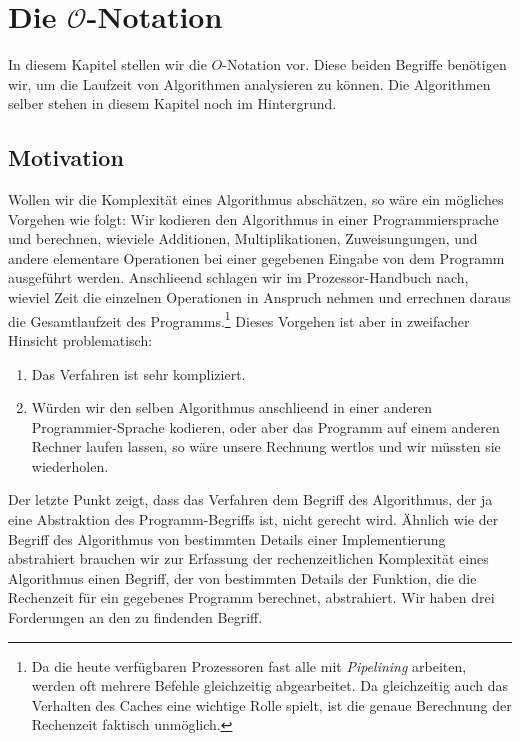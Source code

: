 \chapter{Die $\mathcal{O}$-Notation} 
In diesem Kapitel  stellen wir
die $O$-Notation vor.  Diese beiden Begriffe ben\"otigen wir, um die Laufzeit von
Algorithmen analysieren zu k\"onnen.  Die Algorithmen selber stehen in diesem Kapitel noch
im Hintergrund.

\section{Motivation}
Wollen wir die Komplexit\"at eines Algorithmus absch\"atzen, so w\"are ein m\"ogliches Vorgehen
wie folgt: Wir kodieren den Algorithmus in einer Programmiersprache und berechnen,
wieviele Additionen, Multiplikationen, Zuweisungungen, und andere elementare Operationen
bei einer gegebenen Eingabe von dem Programm ausgef\"uhrt werden. Anschlie\3end schlagen wir
im Prozessor-Handbuch nach, wieviel Zeit die einzelnen Operationen in Anspruch nehmen und
errechnen daraus die Gesamtlaufzeit des Programms.\footnote{
Da die heute verf\"ugbaren Prozessoren fast alle mit \emph{Pipelining} arbeiten, werden oft
mehrere Befehle gleichzeitig abgearbeitet. Da gleichzeitig auch das Verhalten des Caches
eine wichtige Rolle spielt, ist die genaue Berechnung der Rechenzeit faktisch unm\"oglich.}
Dieses Vorgehen ist aber in zweifacher Hinsicht problematisch:
\begin{enumerate}
\item Das Verfahren ist sehr kompliziert.
\item W\"urden wir den selben Algorithmus anschlie\3end in einer anderen Programmier-Sprache
      kodieren, oder aber das Programm auf einem anderen Rechner laufen lassen, so w\"are
      unsere Rechnung wertlos und wir m\"ussten sie wiederholen.
\end{enumerate}
Der letzte Punkt zeigt, dass das Verfahren dem Begriff des Algorithmus, der ja eine
Abstraktion des Programm-Begriffs ist, nicht gerecht wird.  Ähnlich wie der Begriff des
Algorithmus von bestimmten Details einer Implementierung abstrahiert brauchen wir zur
Erfassung der rechenzeitlichen Komplexit\"at eines Algorithmus einen Begriff, der von
bestimmten Details der Funktion, die die Rechenzeit f\"ur ein gegebenes Programm berechnet,
abstrahiert.  Wir haben drei Forderungen an den zu findenden  Begriff.

